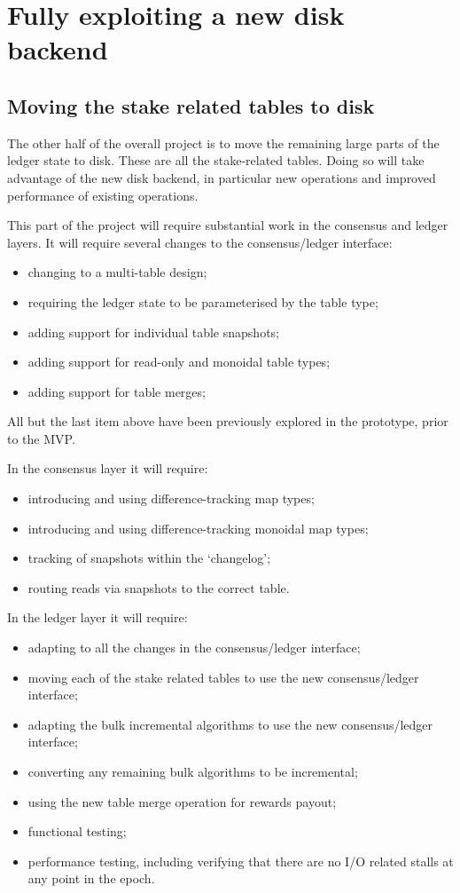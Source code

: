 \documentclass[11pt,a4paper]{article}
\begin{document}
\section{Fully exploiting a new disk backend}

\subsection{Moving the stake related tables to disk}

The other half of the overall project is to move the remaining large parts of
the ledger state to disk. These are all the stake-related tables. Doing so will
take advantage of the new disk backend, in particular new operations and
improved performance of existing operations.

This part of the project will require substantial work in the consensus and
ledger layers. It will require several changes to the consensus/ledger
interface:
\begin{itemize}
\item changing to a multi-table design;
\item requiring the ledger state to be parameterised by the table type;
\item adding support for individual table snapshots;
\item adding support for read-only and monoidal table types;
\item adding support for table merges;
\end{itemize}
All but the last item above have been previously explored in the prototype,
prior to the MVP.

In the consensus layer it will require:
\begin{itemize}
\item introducing and using difference-tracking map types;
\item introducing and using difference-tracking monoidal map types;
\item tracking of snapshots within the `changelog';
\item routing reads via snapshots to the correct table.
\end{itemize}
In the ledger layer it will require:
\begin{itemize}
\item adapting to all the changes in the consensus/ledger interface;
\item moving each of the stake related tables to use the new consensus/ledger interface;
\item adapting the bulk incremental algorithms to use the new consensus/ledger interface;
\item converting any remaining bulk algorithms to be incremental;
\item using the new table merge operation for rewards payout;
\item functional testing;
\item performance testing, including verifying that there are no I/O related
      stalls at any point in the epoch.
\end{itemize}
\end{document}
